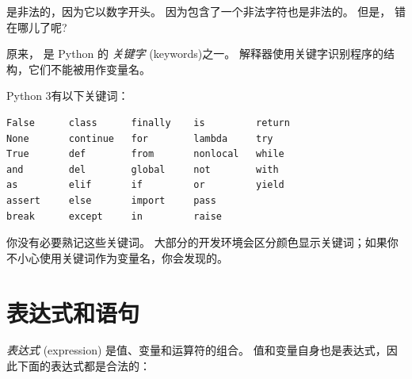 %

 是非法的，因为它以数字开头。  因为包含了一个非法字符也是非法的。 但是， 错在哪儿了呢?

原来， 是 Python 的 {\em 关键字} (keywords)之一。 解释器使用关键字识别程序的结构，它们不能被用作变量名。

Python 3有以下关键词：


\begin{lstlisting}
False      class      finally    is         return
None       continue   for        lambda     try
True       def        from       nonlocal   while
and        del        global     not        with
as         elif       if         or         yield
assert     else       import     pass
break      except     in         raise
\end{lstlisting}

%

你没有必要熟记这些关键词。 大部分的开发环境会区分颜色显示关键词；如果你不小心使用关键词作为变量名，你会发现的。


\section{表达式和语句}


{\em 表达式} (expression) 是值、变量和运算符的组合。 值和变量自身也是表达式，因此下面的表达式都是合法的：
  

